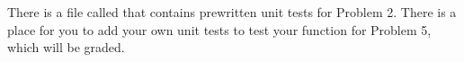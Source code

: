 \begin{unittest}
There is a file called  that contains prewritten unit tests for Problem 2. 
There is a place for you to add your own unit tests to test your function for Problem 5, which will be graded.
\end{unittest}

\begin{comment}
\begin{problem} %
The $l_2$ maximization problem is to
\begin{align*}
\text{maximize}\qquad &\|\x\|_2\\
\text{subject to} \qquad &A\x = \b.
\end{align*}

This problem is equivalent to a quadratic program, since $\|\x\|_2 = \x\trp \x$.
Write a function that accepts a matrix $A$ and vector $\b$ and solves the $l_2$ maximization problem.
Return the maximizer $\x$ and the primal objective value.

To test your function, use the matrix $A$ and vector $\b$ from Problem \ref{prob:l1}. 
The minimizer is approximately $\x=[0.966, 2.169, 0.809, 0.888]\trp $ and the minimum primal objective value is approximately $7.079$.
\end{problem}
\end{comment}
